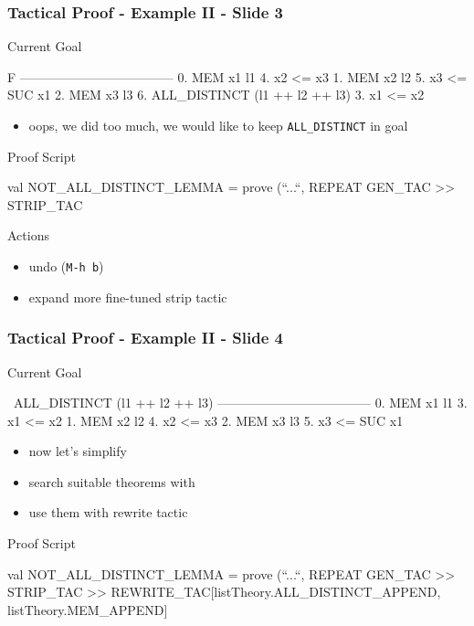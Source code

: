 \begin{frame}[fragile]
\frametitle{Tactical Proof - Example II - Slide 3}

\begin{block}{Current Goal}
\begin{semiverbatim}\small
F
------------------------------------
  0.  MEM x1 l1      4.  x2 <= x3                     
  1.  MEM x2 l2      5.  x3 <= SUC x1                 
  2.  MEM x3 l3      6.  ALL_DISTINCT (l1 ++ l2 ++ l3)
  3.  x1 <= x2
\end{semiverbatim}
\end{block}

\begin{itemize}
\item oops, we did too much, we would like to keep \texttt{ALL\_DISTINCT} in goal
\end{itemize}
\begin{block}{Proof Script}
\begin{semiverbatim}\small
val NOT_ALL_DISTINCT_LEMMA = prove (``...``,
REPEAT GEN\_TAC >> STRIP\_TAC
\end{semiverbatim}
\end{block}

\begin{block}{Actions}
\begin{itemize}
\item undo  (\texttt{M-h b})
\item expand more fine-tuned strip tactic
\end{itemize}
\end{block}
\end{frame}




\begin{frame}[fragile]
\frametitle{Tactical Proof - Example II - Slide 4}

\begin{block}{Current Goal}
\begin{semiverbatim}\small
~ALL_DISTINCT (l1 ++ l2 ++ l3)
------------------------------------
  0.  MEM x1 l1       3.  x1 <= x2    
  1.  MEM x2 l2       4.  x2 <= x3    
  2.  MEM x3 l3       5.  x3 <= SUC x1
\end{semiverbatim}
\end{block}

\begin{itemize}
\item now let's simplify 
\item search suitable theorems with 
\item use them with rewrite tactic
\end{itemize}
\begin{block}{Proof Script}
\begin{semiverbatim}\small
val NOT_ALL_DISTINCT_LEMMA = prove (``...``,
REPEAT GEN\_TAC >> STRIP\_TAC >>
REWRITE\_TAC[listTheory.ALL_DISTINCT\_APPEND, listTheory.MEM\_APPEND]
\end{semiverbatim}
\end{block}
\end{frame}


